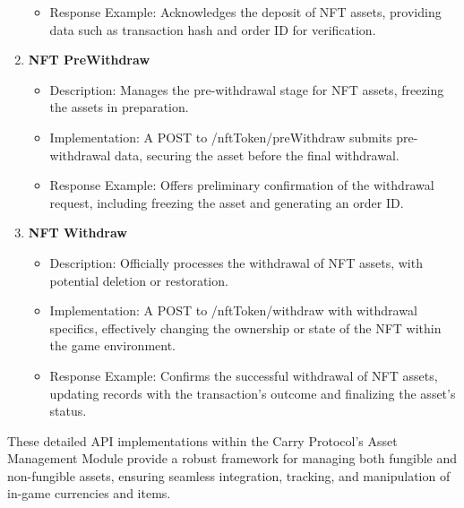 \begin{enumerate}
\begin{itemize}
\item Response Example: Acknowledges the deposit of NFT assets, providing data such as transaction hash and order ID for verification.
\end{itemize}
\item \textbf{NFT PreWithdraw}
\begin{itemize}
        \item Description: Manages the pre-withdrawal stage for NFT assets, freezing the assets in preparation.
\item Implementation: A POST to /nftToken/preWithdraw submits pre-withdrawal data, securing the asset before the final withdrawal.
\item Response Example: Offers preliminary confirmation of the withdrawal request, including freezing the asset and generating an order ID.
\end{itemize}
\item \textbf{NFT Withdraw}
\begin{itemize}
        \item Description: Officially processes the withdrawal of NFT assets, with potential deletion or restoration.
\item Implementation: A POST to /nftToken/withdraw with withdrawal specifics, effectively changing the ownership or state of the NFT within the game environment.
\item Response Example: Confirms the successful withdrawal of NFT assets, updating records with the transaction's outcome and finalizing the asset's status.
\end{itemize}
\end{enumerate}

These detailed API implementations within the Carry Protocol's Asset Management Module provide a robust framework for managing both fungible and non-fungible assets, ensuring seamless integration, tracking, and manipulation of in-game currencies and items.



